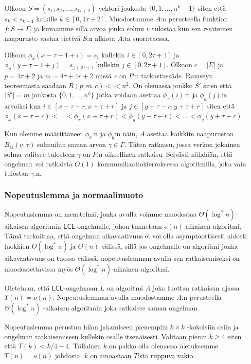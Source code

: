 \documentclass[12pt,finnish]{tktltiki2}
\theoremstyle{definition}
\theoremstyle{remark}
\newcommand*{\lcl}{\ensuremath{\mathsf{LCL}}}
\begin{document}
Olkoon $S = (s_1, s_2,\dots,s_{4\tau+2})$ vektori joukosta $\{0, 1,\dots,n^k - 1\}$ siten että $s_k < s_{k+1}$ kaikille $k \in [0, 4\tau + 2]$. Muodostamme $A$:n perusteella funktion $f: S \rightarrow \Gamma$, ja kuvaamme sillä arvoa jonka solmu $v$ tulostaa kun sen $\tau$-säteinen naapurusto vastaa tiettyä $S$:n alkiota $A$:ta suorittaessa.

Olkoon $\phi_x(x - \tau - 1 + i) = s_i$ kullekin $i \in [0, 2\tau + 1]$ ja $\phi_y(y - \tau - 1 + j) = s_{j+2\tau+1}$ kullekin $j \in [0, 2\tau + 1]$. Olkoon $c = |\Sigma|$ ja $p = 4\tau + 2$ ja $m = 4\tau + 4r + 2$ missä $r$ on $P$:n tarkastussäde. Ramseyn teoreemasta saadaan $R(p, m, c) << n^2$. On olemassa joukko $S'$ siten että $|S'| = m$ joukosta $\{0, 1,\dots,n^k\}$ jotka voidaan asettaa $\phi_x(i)$:n ja $\phi_y(j)$:n arvoiksi kun $i \in [x - \tau - r, x + \tau + r]$ ja $j \in [y - \tau - r, y + \tau + r]$ siten että $\phi_x(x - \tau - r) < \dots < \phi_x(x + \tau + r) < \phi_y(y - \tau - r) < \dots < \phi_y(y + \tau + r)$.

Kun olemme määrittäneet $\phi_x$:n ja $\phi_y$:n näin, $A$ asettaa kaikkiin naapuruston $B_G(v, \tau)$ solmuihin saman arvon $\gamma \in \Gamma$. Täten ratkaisu, jossa verkon jokainen solmu valitsee tulosteen $\gamma$ on $P$:n oikeellinen ratkaisu. Selvästi nähdään, että ongelman voi ratkaista $O(1)$ kommunikaatiokierroksessa algoritmilla, joka vain tulostaa $\gamma$:n.

\subsubsection{Nopeutuslemma ja normaalimuoto}


Nopeutuslemma on menetelmä, jonka avulla voimme muodostaa $\Theta(\log^* n)$-aikaisen algoritmin \lcl -ongelmalle, johon tunnetaan $o(n)$-aikainen algoritmi. Tämä tarkoittaa, että ongelman aikavaativuus ei voi olla asymptoottisesti aidosti luokkien $\Theta(\log^* n)$ ja $\Theta(n)$ välissä, sillä jos ongelmalle on algoritmi jonka aikavaativuus on tuossa välissä, nopeutuslemman avulla sen ratkaisemiseksi on muodostettavissa myös $\Theta(\log^* n)$-aikainen algoritmi.

Oletetaan, että \lcl -ongelmaan $L$ on algoritmi $A$ joka tuottaa ratkaisun ajassa $T(n) = o(n)$. Nopeutuslemman avulla muodostamme $A$:n perusteella $\Theta(\log^* n)$ -aikaisen algoritmin joka ratkaisee saman ongelman.

Nopeutuslemma perustuu hilan jakamiseen pienempiin $k \times k$ -kokoisiin osiin ja ongelman ratkaisemiseen kullekin osalle itsenäisesti. Valitaan pienin $k \geq 4$ siten että $T(k) < k/4 - 4$. Tällainen $k$ on pakko olla olemassa oletuksemme $T(n) = o(n)$ johdosta. $k$ on ainoastaan $T$:stä riippuva vakio.
\end{document}
